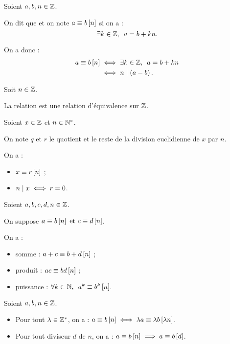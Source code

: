 \begin{defi}
Soient \(a,b,n\in\mathbb{Z}\).

On dit que  et on note \(a\equiv b\left[n\right]\) si on a : \[\quantifs{\exists k\in\Z}a=b+kn.\]

On a donc : \[\begin{aligned}
a\equiv b\croch{n}&\ssi\quantifs{\exists k\in\Z}a=b+kn \\
&\ssi n\divise\paren{a-b}.
\end{aligned}\]
\end{defi}

\begin{rem}
Soit \(n\in\mathbb{Z}\).

La relation  est une relation d'équivalence sur \(\mathbb{Z}\).
\end{rem}

\begin{rem}
Soient \(x\in\mathbb{Z}\) et \(n\in\mathbb{N}^*\).

On note \(q\) et \(r\) le quotient et le reste de la division euclidienne de \(x\) par \(n\).

On a : \begin{itemize}
\item \(x\equiv r\left[n\right]\) ;

\item \(n\mid x\iff r=0\).
\end{itemize}
\end{rem}

\begin{prop}
Soient \(a,b,c,d,n\in\mathbb{Z}\).

On suppose \(a\equiv b\left[n\right]\text{ et }c\equiv d\left[n\right]\).

On a : \begin{itemize}
\item somme : \(a+c\equiv b+d\left[n\right]\) ;

\item produit : \(ac\equiv bd\left[n\right]\) ;

\item puissance : \(\quantifs{\forall k\in\N}a^k\equiv b^k\croch{n}\).
\end{itemize}
\end{prop}

\begin{prop}
Soient \(a,b,n\in\mathbb{Z}\).

\begin{itemize}
\item Pour tout \(\lambda\in\mathbb{Z}^*\), on a : \(a\equiv b\left[n\right]\iff\lambda a\equiv\lambda b\left[\lambda n\right]\).

\item Pour tout diviseur \(d\) de \(n\), on a : \(a\equiv b\left[n\right]\implies a\equiv b\left[d\right]\).
\end{itemize}
\end{prop}

